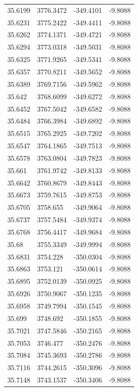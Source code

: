 \begin{table}[H]
\begin{tabular}{llll}
35.6199 & 3776.3472 & -349.4101 & -9.8088 \\
35.6231 & 3775.2422 & -349.4411 & -9.8088 \\
35.6262 & 3774.1371 & -349.4721 & -9.8088 \\
35.6294 & 3773.0318 & -349.5031 & -9.8088 \\
35.6325 & 3771.9265 & -349.5341 & -9.8088 \\
35.6357 & 3770.8211 & -349.5652 & -9.8088 \\
35.6389 & 3769.7156 & -349.5962 & -9.8088 \\
35.642 & 3768.6099 & -349.6272 & -9.8088 \\
35.6452 & 3767.5042 & -349.6582 & -9.8088 \\
35.6484 & 3766.3984 & -349.6892 & -9.8088 \\
35.6515 & 3765.2925 & -349.7202 & -9.8088 \\
35.6547 & 3764.1865 & -349.7513 & -9.8088 \\
35.6578 & 3763.0804 & -349.7823 & -9.8088 \\
35.661 & 3761.9742 & -349.8133 & -9.8088 \\
35.6642 & 3760.8679 & -349.8443 & -9.8088 \\
35.6673 & 3759.7615 & -349.8753 & -9.8088 \\
35.6705 & 3758.655 & -349.9064 & -9.8088 \\
35.6737 & 3757.5484 & -349.9374 & -9.8088 \\
35.6768 & 3756.4417 & -349.9684 & -9.8088 \\
35.68 & 3755.3349 & -349.9994 & -9.8088 \\
35.6831 & 3754.228 & -350.0304 & -9.8088 \\
35.6863 & 3753.121 & -350.0614 & -9.8088 \\
35.6895 & 3752.0139 & -350.0925 & -9.8088 \\
35.6926 & 3750.9067 & -350.1235 & -9.8088 \\
35.6958 & 3749.7994 & -350.1545 & -9.8088 \\
35.699 & 3748.692 & -350.1855 & -9.8088 \\
35.7021 & 3747.5846 & -350.2165 & -9.8088 \\
35.7053 & 3746.477 & -350.2476 & -9.8088 \\
35.7084 & 3745.3693 & -350.2786 & -9.8088 \\
35.7116 & 3744.2615 & -350.3096 & -9.8088 \\
35.7148 & 3743.1537 & -350.3406 & -9.8088 \\

\end{tabular}
\end{table}
